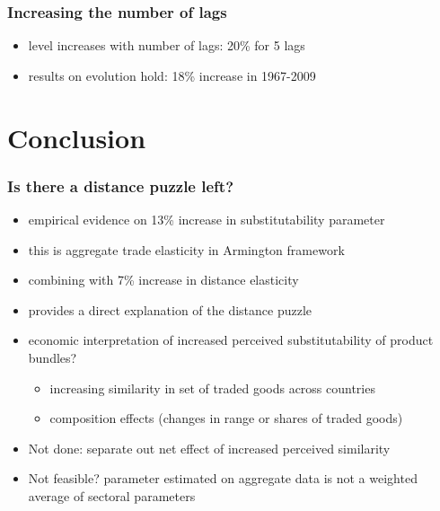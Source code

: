 \documentclass{beamer}
\begin{document}
\begin{frame}[plain]\frametitle{Increasing the number of lags}
\begin{figure}[h!]
\begin{center}
\setlength{\fboxrule}{1pt} %
\setlength{\fboxsep}{.1in} %
\end{center}
\end{figure}
\begin{itemize}
\item level increases with number of lags: 20\% for 5 lags
\item results on evolution hold: 18\% increase in 1967-2009
\end{itemize}
\end{frame}
\fi

\section{Conclusion}
\begin{frame}\frametitle{Is there a distance puzzle left?}
\begin{itemize}
\item empirical evidence on 13\% increase in substitutability parameter
\item this is aggregate trade elasticity in Armington framework
\item combining with 7\% increase in distance elasticity
\item provides a direct explanation of the distance puzzle
\item economic interpretation of increased perceived substitutability of product bundles?
\begin{itemize}
\item increasing similarity in set of traded goods across countries
\item composition effects (changes in range or shares of traded goods)
\end{itemize}
\item Not done: separate out net effect of increased perceived similarity
\item Not feasible? parameter estimated on aggregate data is not a weighted average of sectoral parameters
\end{itemize}
\end{frame}
\end{document}

